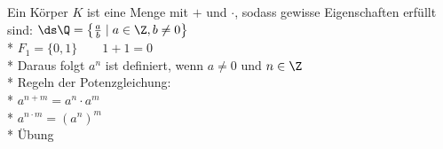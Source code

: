 %
\wdh
Ein Körper $K$ ist eine Menge mit $+$ und $·$, sodass gewisse Eigenschaften erfüllt sind:
\bsp
$\ds\Q = \left\{\frac{a}{b} \mid a \in \Z, b \neq 0\right\}$\\*
$F_1 = \{0, 1\} \qquad 1 + 1 = 0$\\*
Daraus folgt $a^n$ ist definiert, wenn $a \neq 0$ und $n \in \Z$\\*
Regeln der Potenzgleichung:\\*
$a^{n+m} = a^n \cdot a^m$\\*
$a^{n \cdot m} = (a^{n})^m$\\*
\bew
Übung

